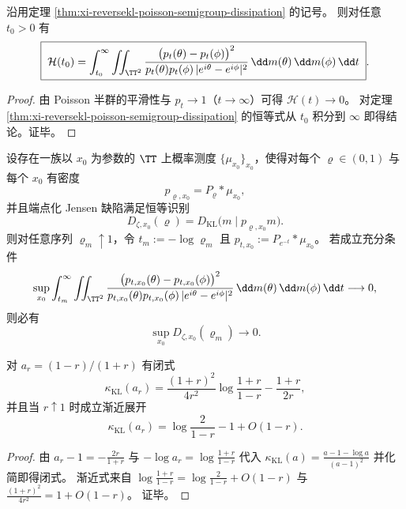 \begin{corollary}[反向相对熵的正项和积分表示]\label{cor:xi-reversekl-positive-integral-representation}
沿用定理 \ref{thm:xi-reversekl-poisson-semigroup-dissipation} 的记号。
则对任意 \(t_0>0\) 有
\[
\boxed{\;
\mathcal H(t_0)
=\int_{t_0}^{\infty}\iint_{\TT^2}
\frac{\bigl(p_t(\theta)-p_t(\phi)\bigr)^2}
{p_t(\theta)p_t(\phi)\,|e^{i\theta}-e^{i\phi}|^2}\,\dd m(\theta)\,\dd m(\phi)\,\dd t\; }.
\]
\end{corollary}
\begin{proof}
由 Poisson 半群的平滑性与 \(p_t\to 1\)（\(t\to\infty\)）可得 \(\mathcal H(t)\to 0\)。
对定理 \ref{thm:xi-reversekl-poisson-semigroup-dissipation} 的恒等式从 \(t_0\) 积分到 \(\infty\) 即得结论。证毕。
\end{proof}

\begin{conjecture}\label{conj:xi-endpoint-jensen-defect-poisson-dissipation-bridge}
设存在一族以 \(x_0\) 为参数的 \(\TT\) 上概率测度 \(\{\mu_{x_0}\}_{x_0}\)，使得对每个 \(\varrho\in(0,1)\) 与每个 \(x_0\) 有密度
\[
p_{\varrho,x_0}=P_{\varrho}*\mu_{x_0},
\]
并且端点化 Jensen 缺陷满足恒等识别
\[
D_{\zeta,x_0}(\varrho)=D_{\mathrm{KL}}\!\bigl(m\mid p_{\varrho,x_0}m\bigr).
\]
则对任意序列 \(\varrho_m\uparrow 1\)，令 \(t_m:=-\log\varrho_m\) 且 \(p_{t,x_0}:=P_{e^{-t}}*\mu_{x_0}\)。
若成立充分条件
\[
\sup_{x_0}\int_{t_m}^{\infty}\iint_{\TT^2}
\frac{\bigl(p_{t,x_0}(\theta)-p_{t,x_0}(\phi)\bigr)^2}
{p_{t,x_0}(\theta)p_{t,x_0}(\phi)\,|e^{i\theta}-e^{i\phi}|^2}\,\dd m(\theta)\,\dd m(\phi)\,\dd t
\longrightarrow 0,
\]
则必有
\[
\sup_{x_0}D_{\zeta,x_0}(\varrho_m)\longrightarrow 0.
\]
\end{conjecture}

\begin{proposition}[常数的闭式化与端点渐近]\label{prop:xi-kappaKL-ar-closed-asymptotic}
对 \(a_r=(1-r)/(1+r)\) 有闭式
\[
\kappa_{\mathrm{KL}}(a_r)
=\frac{(1+r)^2}{4r^2}\log\frac{1+r}{1-r}-\frac{1+r}{2r},
\]
并且当 \(r\uparrow 1\) 时成立渐近展开
\[
\kappa_{\mathrm{KL}}(a_r)=\log\frac{2}{1-r}-1+O(1-r).
\]
\end{proposition}
\begin{proof}
由 \(a_r-1=-\frac{2r}{1+r}\) 与 \(-\log a_r=\log\frac{1+r}{1-r}\) 代入
\(
\kappa_{\mathrm{KL}}(a)=\frac{a-1-\log a}{(a-1)^2}
\)
并化简即得闭式。
渐近式来自
\(
\log\frac{1+r}{1-r}=\log\frac{2}{1-r}+O(1-r)
\)
与
\(
\frac{(1+r)^2}{4r^2}=1+O(1-r)
\)。
证毕。
\end{proof}

